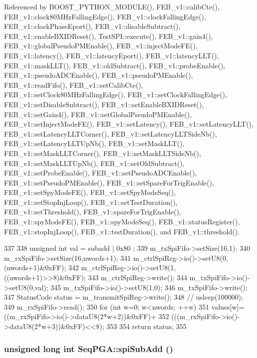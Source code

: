 Referenced by BOOST\_\-PYTHON\_\-MODULE(), FEB\_\-v1::calibCte(), FEB\_\-v1::clock80MHzFallingEdge(), FEB\_\-v1::clockFallingEdge(), FEB\_\-v1::clockPhaseEport(), FEB\_\-v1::disableSubtract(), FEB\_\-v1::enableBXIDReset(), TestSPI::execute(), FEB\_\-v1::gain4(), FEB\_\-v1::globalPseudoPMEnable(), FEB\_\-v1::injectModeFE(), FEB\_\-v1::latency(), FEB\_\-v1::latencyEport(), FEB\_\-v1::latencyLLT(), FEB\_\-v1::maskLLT(), FEB\_\-v1::oldSubtract(), FEB\_\-v1::probeEnable(), FEB\_\-v1::pseudoADCEnable(), FEB\_\-v1::pseudoPMEnable(), FEB\_\-v1::readFifo(), FEB\_\-v1::setCalibCte(), FEB\_\-v1::setClock80MHzFallingEdge(), FEB\_\-v1::setClockFallingEdge(), FEB\_\-v1::setDisableSubtract(), FEB\_\-v1::setEnableBXIDReset(), FEB\_\-v1::setGain4(), FEB\_\-v1::setGlobalPseudoPMEnable(), FEB\_\-v1::setInjectModeFE(), FEB\_\-v1::setLatency(), FEB\_\-v1::setLatencyLLT(), FEB\_\-v1::setLatencyLLTCorner(), FEB\_\-v1::setLatencyLLTSideNb(), FEB\_\-v1::setLatencyLLTUpNb(), FEB\_\-v1::setMaskLLT(), FEB\_\-v1::setMaskLLTCorner(), FEB\_\-v1::setMaskLLTSideNb(), FEB\_\-v1::setMaskLLTUpNb(), FEB\_\-v1::setOldSubtract(), FEB\_\-v1::setProbeEnable(), FEB\_\-v1::setPseudoADCEnable(), FEB\_\-v1::setPseudoPMEnable(), FEB\_\-v1::setSpareForTrigEnable(), FEB\_\-v1::setSpyModeFE(), FEB\_\-v1::setSpyModeSeq(), FEB\_\-v1::setStopInjLoop(), FEB\_\-v1::setTestDuration(), FEB\_\-v1::setThreshold(), FEB\_\-v1::spareForTrigEnable(), FEB\_\-v1::spyModeFE(), FEB\_\-v1::spyModeSeq(), FEB\_\-v1::statusRegister(), FEB\_\-v1::stopInjLoop(), FEB\_\-v1::testDuration(), and FEB\_\-v1::threshold().


\begin{DoxyCode}
337                                                                                  
               { 
338   unsigned int val = subadd | 0x80 ; 
339   m_txSpiFifo->setSize(16,1);
340   m_rxSpiFifo->setSize(16,nwords+1);
341   m_ctrlSpiReg->io()->setU8(0,(nwords+1)&0xFF);
342   m_ctrlSpiReg->io()->setU8(1,((nwords+1)>>8)&0xFF);
343   m_ctrlSpiReg->write();
344   m_txSpiFifo->io()->setU8(0,val);
345   m_txSpiFifo->io()->setU8(1,0);
346   m_txSpiFifo->write();
347   StatusCode status = m_transmitSpiReg->write();  
348   //  usleep(100000);
349   m_rxSpiFifo->read();
350   for (int w=0; w<nwords; ++w) {
351     values[w]=((m_rxSpiFifo->io()->dataU8(2*w+2))&0xFF)+
352       (((m_rxSpiFifo->io()->dataU8(2*w+3))&0xFF)<<8);
353   }
354   return status;
355 }
\end{DoxyCode}
\hypertarget{classSeqPGA_a6422961edd45abad31e6d79e0564c48f}{
\subsubsection[{spiSubAdd}]{\setlength{\rightskip}{0pt plus 5cm}unsigned long int SeqPGA::spiSubAdd ()}}
\label{classSeqPGA_a6422961edd45abad31e6d79e0564c48f}


